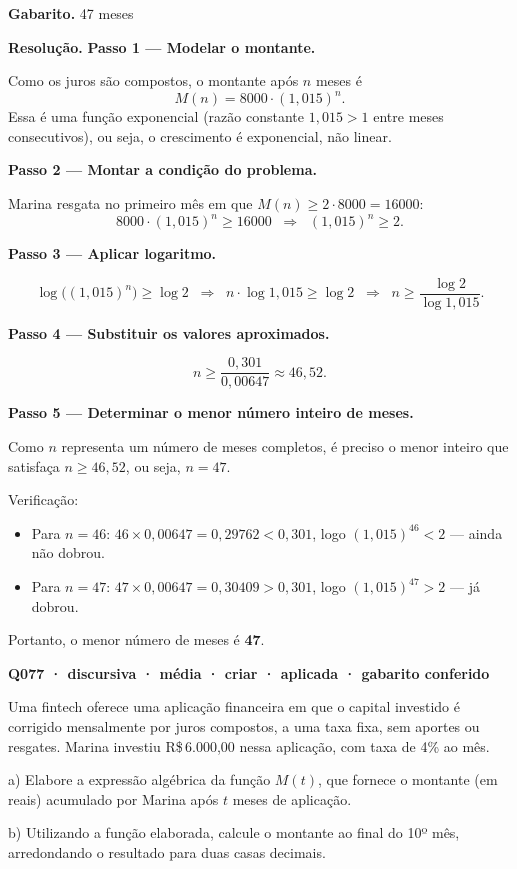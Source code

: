 \documentclass[11pt,a4paper]{article}
\begin{document}
\textbf{Gabarito.} 47 meses

\textbf{Resolução.} \textbf{Passo 1 — Modelar o montante.}

Como os juros são compostos, o montante após $n$ meses é
$$M(n) = 8000\cdot(1{,}015)^n.$$
Essa é uma função exponencial (razão constante $1{,}015>1$ entre meses consecutivos), ou seja, o crescimento é exponencial, não linear.

\textbf{Passo 2 — Montar a condição do problema.}

Marina resgata no primeiro mês em que $M(n)\ge 2\cdot 8000 = 16000$:
$$8000\cdot(1{,}015)^n \ge 16000 \;\;\Rightarrow\;\; (1{,}015)^n \ge 2.$$

\textbf{Passo 3 — Aplicar logaritmo.}

$$\log\big((1{,}015)^n\big) \ge \log 2 \;\;\Rightarrow\;\; n\cdot \log 1{,}015 \ge \log 2 \;\;\Rightarrow\;\; n \ge \dfrac{\log 2}{\log 1{,}015}.$$

\textbf{Passo 4 — Substituir os valores aproximados.}

$$n \ge \dfrac{0{,}301}{0{,}00647} \approx 46{,}52.$$

\textbf{Passo 5 — Determinar o menor número inteiro de meses.}

Como $n$ representa um número de meses completos, é preciso o menor inteiro que satisfaça $n\ge 46{,}52$, ou seja, $n = 47$.

Verificação:
\begin{itemize}[nosep,leftmargin=*]
\item Para $n=46$: $46\times 0{,}00647 = 0{,}29762 < 0{,}301$, logo $(1{,}015)^{46}<2$ — ainda não dobrou.
\item Para $n=47$: $47\times 0{,}00647 = 0{,}30409 > 0{,}301$, logo $(1{,}015)^{47}>2$ — já dobrou.
\end{itemize}

Portanto, o menor número de meses é \textbf{47}.

\bigskip\noindent\textbf{Q077 · discursiva · média · criar · aplicada · gabarito conferido}\par\nopagebreak
Uma fintech oferece uma aplicação financeira em que o capital investido é corrigido mensalmente por juros compostos, a uma taxa fixa, sem aportes ou resgates. Marina investiu R\$\,6.000,00 nessa aplicação, com taxa de 4\% ao mês.

a) Elabore a expressão algébrica da função $M(t)$, que fornece o montante (em reais) acumulado por Marina após $t$ meses de aplicação.

b) Utilizando a função elaborada, calcule o montante ao final do 10º mês, arredondando o resultado para duas casas decimais.
\end{document}
